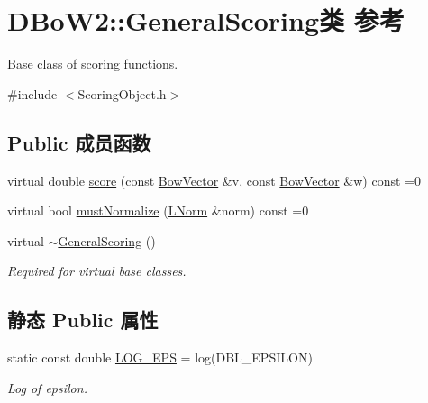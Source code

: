 \hypertarget{classDBoW2_1_1GeneralScoring}{\section{D\-Bo\-W2\-:\-:General\-Scoring类 参考}
\label{classDBoW2_1_1GeneralScoring}
}


Base class of scoring functions.  




{\ttfamily \#include $<$Scoring\-Object.\-h$>$}

\subsection*{Public 成员函数}
\begin{DoxyCompactItemize}
\item 
virtual double \hyperlink{classDBoW2_1_1GeneralScoring_a43b3f5fedb19e6a19e17b9813efd17e8}{score} (const \hyperlink{classDBoW2_1_1BowVector}{Bow\-Vector} \&v, const \hyperlink{classDBoW2_1_1BowVector}{Bow\-Vector} \&w) const =0
\item 
virtual bool \hyperlink{classDBoW2_1_1GeneralScoring_ab0cadafd50b0f2f559f6325a6944f72f}{must\-Normalize} (\hyperlink{namespaceDBoW2_a53e9e0bcfc25c861815e413a7cf3fa51}{L\-Norm} \&norm) const =0
\item 
\hypertarget{classDBoW2_1_1GeneralScoring_a1796812280a5188e06d8137baa977776}{virtual \hyperlink{classDBoW2_1_1GeneralScoring_a1796812280a5188e06d8137baa977776}{$\sim$\-General\-Scoring} ()}\label{classDBoW2_1_1GeneralScoring_a1796812280a5188e06d8137baa977776}

\begin{DoxyCompactList}\small\item\em Required for virtual base classes. \end{DoxyCompactList}\end{DoxyCompactItemize}
\subsection*{静态 Public 属性}
\begin{DoxyCompactItemize}
\item 
\hypertarget{classDBoW2_1_1GeneralScoring_af470bccf750689525622f216f07d6f3c}{static const double \hyperlink{classDBoW2_1_1GeneralScoring_af470bccf750689525622f216f07d6f3c}{L\-O\-G\-\_\-\-E\-P\-S} = log(D\-B\-L\-\_\-\-E\-P\-S\-I\-L\-O\-N)}\label{classDBoW2_1_1GeneralScoring_af470bccf750689525622f216f07d6f3c}

\begin{DoxyCompactList}\small\item\em Log of epsilon. \end{DoxyCompactList}\end{DoxyCompactItemize}


